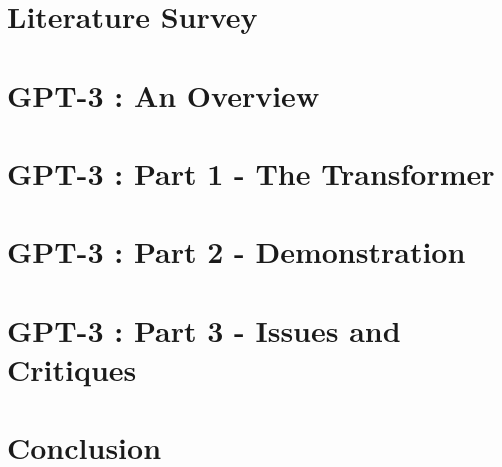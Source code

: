 \documentclass[12pt, a4paper]{report}
\begin{document}
\newpage
\chapter*{Literature Survey}
\label{chap:literature}

\newpage
\chapter*{GPT-3 : An Overview}
\label{chap:overview}

\newpage
\chapter*{GPT-3 : Part 1 - The Transformer}
\label{chap:transformer}

\newpage
\chapter*{GPT-3 : Part 2 - Demonstration}
\label{chap:demonstration}

\newpage
\chapter*{GPT-3 : Part 3 - Issues and Critiques}
\label{chap:critiques}

\newpage
\chapter*{Conclusion}
\label{chap:conclusion}




\end{document}

